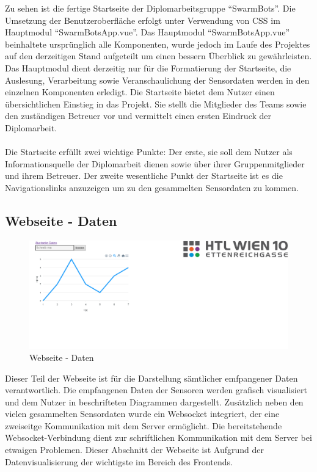 Zu sehen ist die fertige Startseite der Diplomarbeitsgruppe ``SwarmBots''. 
Die Umsetzung der Benutzeroberfläche erfolgt unter Verwendung von CSS im Hauptmodul ``SwarmBotsApp.vue''.
%
Das Hauptmodul ``SwarmBotsApp.vue'' beinhaltete ursprünglich alle Komponenten, wurde jedoch im Laufe des Projektes
auf den derzeitigen Stand aufgeteilt um einen bessern Überblick zu gewährleisten.
%
Das Hauptmodul dient derzeitig nur für die Formatierung der Startseite, die Auslesung, Verarbeitung 
sowie Veranschaulichung der Sensordaten werden in den einzelnen Komponenten erledigt. 
%
Die Startseite bietet dem Nutzer einen übersichtlichen Einstieg in das Projekt. Sie stellt die Mitglieder des Teams
sowie den zuständigen Betreuer vor und vermittelt einen ersten Eindruck der Diplomarbeit. \\
% 
\\
Die Startseite erfüllt zwei wichtige Punkte: Der erste, sie soll dem Nutzer als Informationsquelle der 
Diplomarbeit dienen sowie über ihrer Gruppenmitglieder und ihrem Betreuer. 
Der zweite wesentliche Punkt der Startseite ist es die Navigationslinks anzuzeigen um zu den 
gesammelten Sensordaten zu kommen. 

\subsection{Webseite - Daten}
\label{subsubsec:Webseite_Daten}

\begin{figure}[H]
  \includegraphics[width=\textwidth, center]{img/Webseite_Daten.png}
  \caption{Webseite - Daten}
  \label{fig:Webseite_Daten}
\end{figure}

Dieser Teil der Webseite ist für die Darstellung sämtlicher emfpangener Daten verantwortlich.
Die empfangenen Daten der Sensoren werden grafisch visualisiert und dem Nutzer in beschrifteten Diagrammen dargestellt. 
%
Zusätzlich neben den vielen gesammelten Sensordaten wurde ein Websocket integriert, 
der eine zweiseitge Kommunikation mit dem Server ermöglicht. 
%
Die bereitstehende Websocket-Verbindung dient zur schriftlichen Kommunikation mit dem Server bei etwaigen Problemen.
%
Dieser Abschnitt der Webseite ist Aufgrund der Datenvisualisierung der wichtigste im Bereich des Frontends.

